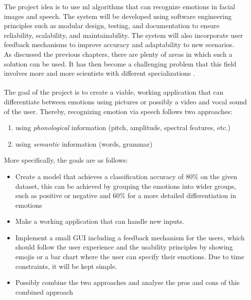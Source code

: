 \noindent The project idea is to use \acrshort{ml} algorithms that can recognize emotions in facial images and speech. The system will be developed using software engineering principles such as modular design, testing, and documentation to ensure reliability, scalability, and maintainability. The system will also incorporate user feedback mechanisms to improve accuracy and adaptability to new scenarios. \\

\noindent As discussed the previous chapters, there are plenty of areas in which such a solution can be used. It has then become a challenging problem that this field involves more and more scientists with different specializations \cite{HCSI201451}. %
\\\\
\noindent The goal of the project is to create a viable, working application that can differentiate between emotions using pictures or possibly a video and vocal sound of the user. Thereby, recognizing emotion via speech follows two approaches: 
\begin{enumerate}
    \item using \emph{phonological} information (pitch, amplitude, spectral features, etc.)
    \item using \emph{semantic} information (words, grammar)
\end{enumerate}
\newpage
\noindent More specifically, the goals are as follows:

\begin{itemize}

    \item Create a model that achieves a classification accuracy of 80\% on the given dataset, this can be achieved by grouping the emotions into wider groups, such as positive or negative and 60\% for a more detailed differentiation in emotions
    \item Make a working application that can handle new inputs.
    \item Implement a small GUI including a feedback mechanism for the users, which should follow the user experience and the usability principles by showing emojis or a bar chart where the user can specify their emotions. Due to time constraints, it will be kept simple. 
    \item Possibly combine the two approaches and analyse the pros and cons of this combined approach
\end{itemize}

